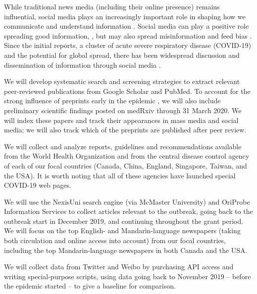 While traditional news media (including their online presence) remains influential,  social media plays an increasingly important role in shaping how we communicate and understand information \citep{LiuSieg19}. Social media can play a positive role spreading good information, \cite{BascHill20, SunYang20,AhmeQuin18}, but may also spread misinformation and feed bias \citep{ChouOhA18, McKevan19}.
Since the initial reports, a cluster of acute severe respiratory disease (COVID-19) and the potential for global spread, there has been widespread discussion and dissemination of information through social media \citep{AhmeBath19, ChewEyse10, TangBie18}.



 We will develop systematic search and screening strategies to extract relevant peer-reviewed publications from Google Scholar and PubMed. To account for the strong influence of preprints early in the epidemic \cite{MajuMandPRE}, we will also include preliminary scientific findings posted on medRxiv through 31 March 2020. We will index these papers and track their appearances in mass media and social media; we will also track which of the preprints are published after peer review.

 We will collect and analyze reports, guidelines and recommendations available from the World Health Organization and from the central disease control agency of each of our focal countries (Canada, China, England, Singapore, Taiwan, and the USA). It is worth noting that all of these agencies have launched special COVID-19 web pages.

 We will use the NexisUni search engine (via McMaster University) and OriProbe Information Services to collect articles relevant to the outbreak, going back to the outbreak start in December 2019, and continuing throughout the grant period. 
We will focus on the top English- and Mandarin-language newspapers (taking both circulation and online access into account) from our focal countries, including the top Mandarin-language newspapers in both Canada and the USA.

We will collect data from Twitter and Weibo by purchasing API access and writing special-purpose scripts, using data going back to November 2019 -- before the epidemic started -- to give a baseline for comparison. 

